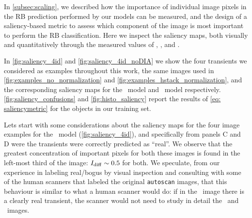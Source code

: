 In \autoref{subsec:scaling}, we described how the importance of individual image pixels in the RB prediction performed by our models can be measured, and the design of a saliency-based metric to assess which component of the image is most important to perform the RB classification. Here we inspect the saliency maps, both visually and quantitatively through the measured values of \idiff, \isearch, and \itempl. 


In \autoref{fig:saliency_4id} and \autoref{fig:saliency_4id_noDIA} we show the four transients we considered as examples throughout this work, the same images used in \autoref{fig:examples_no_normalization} and \autoref{fig:examples_hstack_normalization}, and the corresponding saliency maps for the \diabased\ model and \nodia\ model respectively. \autoref{fig:saliency_confusions} and \autoref{fig:histo_saliency} report the results of \autoref{eq: saliencymetric} for the objects in our training set.

Lets start with some considerations about the saliency maps for the four image examples for the \diabased\ model (\autoref{fig:saliency_4id}), and specifically from  panels C and D were the transients were correctly predicted as ``real''. We observe that the greatest concentration of important pixels for both these images is found in the left-most third of the image: %
$I_\mathrm{diff} \sim 0.5 $ for both. 
We speculate, from our experience in labeling real/bogus by visual inspection and consulting with some of the human scanners that labeled the original \texttt{autoscan} images, that this behaviour is similar to what a human scanner would do: if in the \diff\ image there is a clearly real transient, the scanner would not need to study in detail the \search\ and \temp\ images. 

